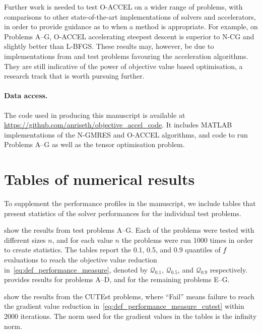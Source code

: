 \documentclass[main.tex]{subfiles}
\begin{document}
Further work is needed to test O-ACCEL on a wider range of problems,
with comparisons to other state-of-the-art implementations of solvers
and accelerators, in order to provide guidance as to when a method is
appropriate.  For example, on Problems A--G, O-ACCEL accelerating
steepest descent is superior to N-CG and slightly better than
L-BFGS. These results may, however, be due to implementations from
\citet{sterck2013steepest} and test problems favouring the
acceleration algorithms. They are still indicative of the power of
objective value based optimisation, a research track that is worth
pursuing further.



\paragraph*{Data access.}
The code used in producing this manuscript is available at
\url{https://github.com/anriseth/objective_accel_code}.  It includes
MATLAB implementations of the N-GMRES and O-ACCEL algorithms, and code
to run Problems A--G as well as the tensor optimisation problem.


\section{Tables of numerical results}
To supplement the performance profiles in the manuscript, we include
tables that present statistics of the solver performances for the
individual test problems.

 show the results from test problems A--G.
Each of the problems were tested with different sizes $n$, and for
each value $n$ the problems were run \num{1000} times in order to
create statistics.  The tables report the \num{0.1}, \num{0.5}, and
\num{0.9} quantiles of $f$ evaluations to reach the objective value
reduction in~\eqref{eq:def_performance_measure}, denoted by
$\mathcal{Q}_{0.1}$, $\mathcal{Q}_{0.5}$, and $\mathcal{Q}_{0.9}$
respectively.   provides results for problems A--D,
and  for the remaining problems E--G.

 show the results from the
CUTEst problems, where ``Fail'' means failure to reach the gradient
value reduction in~\eqref{eq:def_performance_measure_cutest} within
\num{2000} iterations.  The norm used for the gradient values in the
tables is the infinity norm.
\end{document}
